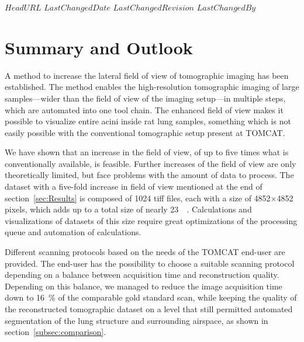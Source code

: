 \svnidlong
{$HeadURL$}
{$LastChangedDate$}
{$LastChangedRevision$}
{$LastChangedBy$}
%
\section{Summary and Outlook\label{summary and outlook}}

A method to increase the lateral field of view of tomographic imaging has been established. The method enables the high-resolution tomographic imaging of large samples---wider than the field of view of the imaging setup---in multiple steps, which are automated into one tool chain. The enhanced field of view makes it possible to visualize entire acini inside rat lung samples, something which is not easily possible with the conventional tomographic setup present at TOMCAT.

We have shown that an increase in the field of view, of up to five times what is conventionally available, is feasible. Further increases of the field of view are only theoretically limited, but face problems with the amount of data to process. The dataset with a five-fold increase in field of view mentioned at the end of section~\ref{sec:Results} is composed of 1024 tiff files, each with a size of 4852$\times$4852 pixels, which adds up to a total size of nearly \SI{23}{\giga\byte}. Calculations and visualizations of datasets of this size require great optimizations of the processing queue and automation of calculations.

Different scanning protocols based on the needs of the TOMCAT end-user are provided. The end-user has the possibility to choose a suitable scanning protocol depending on a balance between acquisition time and reconstruction quality. Depending on this balance, we managed to reduce the image acquisition time down to \SI{16}{\percent} of the comparable gold standard scan, while keeping the quality of the reconstructed tomographic dataset on a level that still permitted automated segmentation of the lung structure and surrounding airspace, as shown in section~\ref{subsec:comparison}.